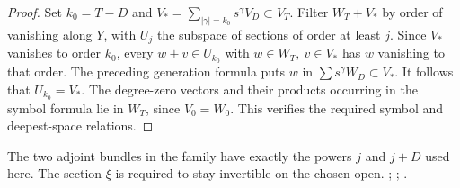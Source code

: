 \begin{proof}
Set \(k_0=T-D\) and
\(V_*=\sum_{|\gamma|=k_0}s^\gamma V_D\subset V_T\).
Filter \(W_T+V_*\) by order of vanishing along \(Y\), with
\(U_j\) the subspace of sections of order at least \(j\).
Since \(V_*\) vanishes to order \(k_0\), every
\(w+v\in U_{k_0}\) with \(w\in W_T,\ v\in V_*\) has \(w\) vanishing
to that order. The preceding generation formula puts \(w\) in
\(\sum s^\gamma W_D\subset V_*\). It follows that \(U_{k_0}=V_*\).
The degree-zero vectors and their products occurring in the symbol
formula lie in \(W_T\), since \(V_0=W_0\). This verifies the
required symbol and deepest-space relations.
\end{proof}
The two adjoint bundles in the family have exactly the powers \(j\)
and \(j+D\) used here. The section \(\xi\) is required to stay
invertible on the chosen open.
;
;
.

